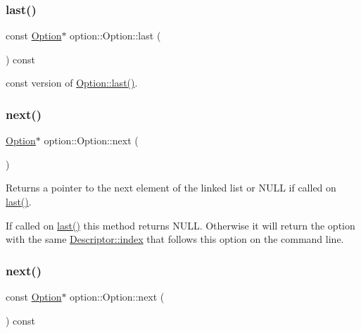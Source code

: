 \subsubsection{\texorpdfstring{last()}{last()}\hspace{0.1cm}{\footnotesize\ttfamily [2/2]}}
{\footnotesize\ttfamily const \hyperlink{classoption_1_1_option}{Option}$\ast$ option\+::\+Option\+::last (\begin{DoxyParamCaption}{ }\end{DoxyParamCaption}) const\hspace{0.3cm}{\ttfamily [inline]}}

const version of \hyperlink{classoption_1_1_option_afe2aff68191e55b59c53fac3dbbcd7c3}{Option\+::last()}. \mbox{\label{classoption_1_1_option_a59ae9aed505f4d410633bb36478a32be}} 
\subsubsection{\texorpdfstring{next()}{next()}\hspace{0.1cm}{\footnotesize\ttfamily [1/2]}}
{\footnotesize\ttfamily \hyperlink{classoption_1_1_option}{Option}$\ast$ option\+::\+Option\+::next (\begin{DoxyParamCaption}{ }\end{DoxyParamCaption})\hspace{0.3cm}{\ttfamily [inline]}}



Returns a pointer to the next element of the linked list or N\+U\+LL if called on \hyperlink{classoption_1_1_option_afe2aff68191e55b59c53fac3dbbcd7c3}{last()}. 

If called on \hyperlink{classoption_1_1_option_afe2aff68191e55b59c53fac3dbbcd7c3}{last()} this method returns N\+U\+LL. Otherwise it will return the option with the same \hyperlink{structoption_1_1_descriptor_a1fee8ac44f529c99ac2b1149b4c391b1}{Descriptor\+::index} that follows this option on the command line. \mbox{\label{classoption_1_1_option_a5ffc96c24288bb1fa9330ebb62da7da6}} 
\subsubsection{\texorpdfstring{next()}{next()}\hspace{0.1cm}{\footnotesize\ttfamily [2/2]}}
{\footnotesize\ttfamily const \hyperlink{classoption_1_1_option}{Option}$\ast$ option\+::\+Option\+::next (\begin{DoxyParamCaption}{ }\end{DoxyParamCaption}) const\hspace{0.3cm}{\ttfamily [inline]}}


